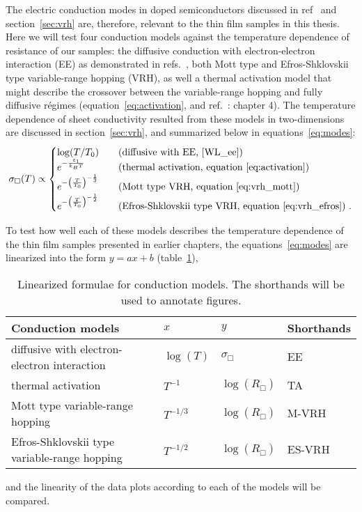 The electric conduction modes in doped semiconductors discussed in ref~\cite{schklovskii_efros} and section~\ref{sec:vrh} are, therefore, relevant to the thin film samples in this thesis. Here we will test four conduction models against the temperature dependence of resistance of our samples: the diffusive conduction with electron-electron interaction (EE) as demonstrated in refs.~\cite{Chen2011, Liu2011, Roy2013, liao2015}, both Mott type and Efros-Shklovskii type variable-range hopping (VRH), as well a thermal activation model that might describe the crossover between the variable-range hopping and fully diffusive r\'egimes (equation~\ref{eq:activation}, and ref.~\cite{schklovskii_efros}: chapter 4). The temperature dependence of sheet conductivity resulted from these models in two-dimensions are discussed in section~\ref{sec:vrh}, and summarized below in equations~\ref{eq:modes}:%
\begin{equation}\label{eq:modes}
    \sigma_\Box(T) \propto %
    \begin{cases}
        \log(T / T_0)  & \quad \text{(diffusive with EE, \cite{WL_ee})}\\
        e^{-\frac{\varepsilon_1}{k_B T}}   & \quad \text{(thermal activation, equation~\ref{eq:activation})}\\
        e^{-\left(\frac{T}{T_0}\right)^{-\frac{1}{3}}}   & \quad \text{(Mott type VRH, equation~\ref{eq:vrh_mott})}\\
        e^{-\left(\frac{T}{T_0}\right)^{-\frac{1}{2}}} & \quad \text{(Efros-Shklovskii type VRH, equation~\ref{eq:vrh_efros})}~.
    \end{cases}
\end{equation}%

To test how well each of these models describes the temperature dependence of the thin film samples presented in earlier chapters, the equations~\ref{eq:modes} are linearized into the form $y=ax+b$ (table~\ref{tab:models}), %
\begin{table}[ht]
    \centering
    \begin{tabularx}{0.95\columnwidth}[t]{l|l|l|X}
    \caption[Linearized formulae for testing conduction models]{\label{tab:models}Linearized formulae for conduction models. The shorthands will be used to annotate figures.}\\
		\hline\hline
        Conduction models & $x$ & $y$ & Shorthands\\
        \hline%
        diffusive with electron-electron interaction & $\log(T)$ & $\sigma_\Box$ & EE\\
        thermal activation & $T^{-1}$ & $\log\left(R_\Box\right)$ & TA\\
        Mott type variable-range hopping & $T^{-1/3}$ & $\log\left(R_\Box\right)$ & M-VRH\\
        Efros-Shklovskii type variable-range hopping & $T^{-1/2}$ & $\log\left(R_\Box\right)$ & ES-VRH\\
		\hline\hline
    \end{tabularx}
\end{table}%
%
and the linearity of the data plots according to each of the models will be compared.

